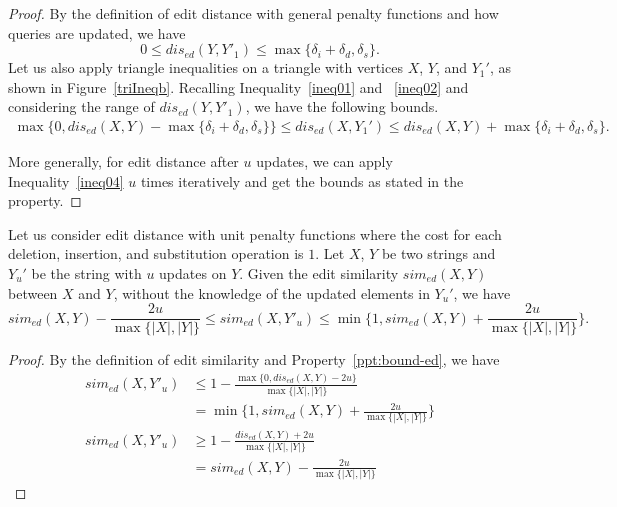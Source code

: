 \begin{proof}
By the definition of edit distance with general penalty functions and how queries are updated, we have $$0 \leq dis_{ed}(Y, Y'_1)\leq \max\{ \delta_i + \delta_d, \delta_s\}\text{.}$$ Let us also apply triangle inequalities on a triangle with vertices $X$, $Y$, and $Y_1'$, as shown in Figure~\ref{triIneqb}. Recalling Inequality~\ref{ineq01} and ~\ref{ineq02} and considering the range of $dis_{ed}(Y, Y'_1)$, we have the following bounds.     
\begin{align}\label{ineq04}
\max\{0, dis_{ed}(X, Y) - \max\{\delta_i + \delta_d, \delta_s\} \} \leq dis_{ed}(X, Y_1') \leq dis_{ed}(X, Y) + \max\{\delta_i+\delta_d, \delta_s\}\text{.}
\end{align}

More generally, for edit distance after $u$ updates, we can apply Inequality~\ref{ineq04} $u$ times iteratively and get the bounds as stated in the property.
\end{proof}


\begin{property}\label{ppt:bound-es}

Let us consider edit distance with unit penalty functions where the cost for each deletion, insertion, and substitution operation is $1$. Let $X$, $Y$ be two strings and $Y_u'$ be the string with $u$ updates on $Y$. Given the edit similarity $sim_{ed}(X, Y)$ between $X$ and $Y$, without the knowledge of the updated elements in $Y_u'$, we have 
$$sim_{ed}(X, Y)-\frac{2u}{\max\{|X|, |Y|\}} \leq sim_{ed}(X, Y'_u) \leq \min\{1, sim_{ed}(X,Y)+\frac{2u}{\max\{|X|, |Y|\}}\}.$$
\end{property}

\begin{proof}
By the definition of edit similarity and Property~\ref{ppt:bound-ed}, we have 
\begin{align*} 
sim_{ed}(X, Y'_u) &\leq 1 - \frac{\max\{0, dis_{ed}(X, Y) - 2u\}}{\max\{|X|, |Y|\}}\\
&=\min\{1, sim_{ed}(X,Y)+\frac{2u}{\max\{|X|, |Y|\}}\}\\
sim_{ed}(X, Y'_u) &\geq 1 - \frac{dis_{ed}(X, Y) + 2u}{\max\{|X|, |Y|\}}\\
&= sim_{ed}(X, Y)-\frac{2u}{\max\{|X|, |Y|\}}
\end{align*}
\end{proof}

